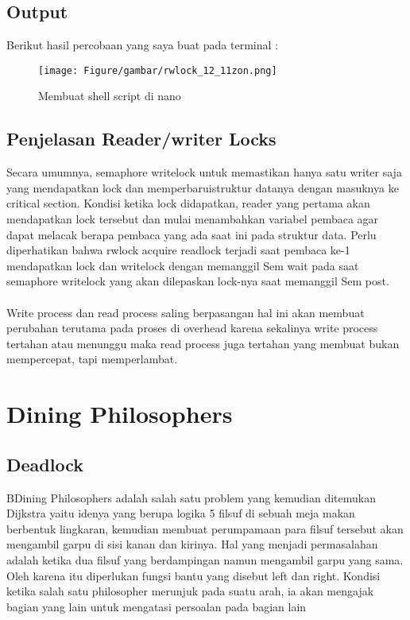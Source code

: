 \documentclass[11pt,a4paper]{article}
\begin{document}
\subsection{\textbf{Output}}
    Berikut hasil percobaan yang saya buat pada terminal :
    
    \begin{figure}[h]
        \centering
        \texttt{[image: Figure/gambar/rwlock\_12\_11zon.png]}
        \caption{Membuat shell script di nano}
        \label{fig:asg6_1}
    \end{figure}

\subsection{\textbf{Penjelasan Reader/writer Locks}}
   Secara umumnya, semaphore writelock untuk memastikan hanya satu writer saja yang mendapatkan lock dan memperbaruistruktur datanya dengan masuknya ke critical section. Kondisi ketika lock didapatkan, reader yang pertama akan mendapatkan lock tersebut dan mulai menambahkan variabel pembaca agar dapat melacak berapa pembaca yang ada saat ini pada struktur data. Perlu diperhatikan bahwa rwlock acquire readlock terjadi saat pembaca ke-1 mendapatkan lock dan writelock dengan memanggil Sem wait pada saat semaphore writelock yang akan dilepaskan lock-nya saat memanggil Sem post. \\\\
   Write process dan read process saling berpasangan hal ini akan membuat perubahan terutama pada proses di overhead karena sekalinya write process tertahan atau menunggu maka read process juga tertahan yang membuat bukan mempercepat, tapi memperlambat.

\newpage   
\section{\textbf{Dining Philosophers}}
\subsection{\textbf{Deadlock}}
BDining Philosophers adalah salah satu problem yang kemudian ditemukan Dijkstra yaitu idenya yang berupa logika 5 filsuf di sebuah meja makan berbentuk lingkaran, kemudian membuat perumpamaan para filsuf tersebut akan mengambil garpu di sisi kanan dan kirinya. Hal yang menjadi permasalahan adalah ketika dua filsuf yang berdampingan namun mengambil garpu yang sama. Oleh karena itu diperlukan fungsi bantu yang disebut left dan right. Kondisi ketika salah satu philosopher merunjuk pada suatu arah, ia akan mengajak bagian yang lain untuk mengatasi persoalan pada bagian lain
\end{document}
